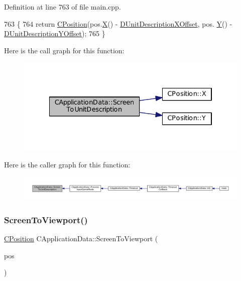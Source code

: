 Definition at line 763 of file main.\+cpp.


\begin{DoxyCode}
763                                                                        \{
764     \textcolor{keywordflow}{return} \hyperlink{classCPosition}{CPosition}(pos.\hyperlink{classCPosition_a9a6b94d3b91df1492d166d9964c865fc}{X}() - \hyperlink{classCApplicationData_a5653b5d0eff32ccd540ad60f5c331c24}{DUnitDescriptionXOffset}, pos.
      \hyperlink{classCPosition_a1aa8a30e2f08dda1f797736ba8c13a87}{Y}() - \hyperlink{classCApplicationData_a6c60b2da482699f1d998acfe24fec332}{DUnitDescriptionYOffset});
765 \}
\end{DoxyCode}
Here is the call graph for this function\+:\nopagebreak
\begin{figure}[H]
\begin{center}
\leavevmode
\includegraphics[width=334pt]{classCApplicationData_a5400b710281ac2671d8d76aa442124ec_cgraph}
\end{center}
\end{figure}
Here is the caller graph for this function\+:\nopagebreak
\begin{figure}[H]
\begin{center}
\leavevmode
\includegraphics[width=350pt]{classCApplicationData_a5400b710281ac2671d8d76aa442124ec_icgraph}
\end{center}
\end{figure}
\hypertarget{classCApplicationData_aebd3ae4cfd74962413024f1649233f08}{}\label{classCApplicationData_aebd3ae4cfd74962413024f1649233f08} 
\subsubsection{\texorpdfstring{Screen\+To\+Viewport()}{ScreenToViewport()}}
{\footnotesize\ttfamily \hyperlink{classCPosition}{C\+Position} C\+Application\+Data\+::\+Screen\+To\+Viewport (\begin{DoxyParamCaption}\item[{const \hyperlink{classCPosition}{C\+Position} \&}]{pos }\end{DoxyParamCaption})\hspace{0.3cm}{\ttfamily [protected]}}



